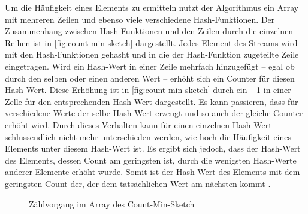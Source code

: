 Um die Häufigkeit eines Elements zu ermitteln 
nutzt der Algorithmus ein Array mit mehreren Zeilen 
und ebenso viele verschiedene Hash-Funktionen.
Der Zusammenhang zwischen Hash-Funktionen und den Zeilen durch die einzelnen Reihen ist in \autoref{fig:count-min-sketch} dargestellt. 
Jedes Element des Streams wird mit den Hash-Funktionen gehasht 
und in die der Hash-Funktion zugeteilte Zeile eingetragen. 
Wird ein Hash-Wert in einer Zeile mehrfach hinzugefügt -- egal ob durch den selben oder einen anderen Wert -- 
erhöht sich ein Counter für diesen Hash-Wert. 
Diese Erhöhung ist in \autoref{fig:count-min-sketch} durch ein +1 in einer Zelle für den entsprechenden Hash-Wert dargestellt.
Es kann passieren, dass für verschiedene Werte der selbe Hash-Wert erzeugt 
und so auch der gleiche Counter erhöht wird.
Durch dieses Verhalten kann für einen einzelnen Hash-Wert 
schlussendlich nicht mehr unterschieden werden, 
wie hoch die Häufigkeit eines Elements unter diesem Hash-Wert ist. 
Es ergibt sich jedoch, dass der Hash-Wert des Elements, dessen Count am geringsten ist, 
durch die wenigsten Hash-Werte anderer Elemente erhöht wurde. 
Somit ist der Hash-Wert des Elements mit dem geringsten Count der, 
der dem tatsächlichen Wert am nächsten kommt \cite{cormode2017}.

\begin{figure}
	\centering
	\caption{Zählvorgang im Array des Count-Min-Sketch}
	\label{fig:count-min-sketch}
\end{figure}

